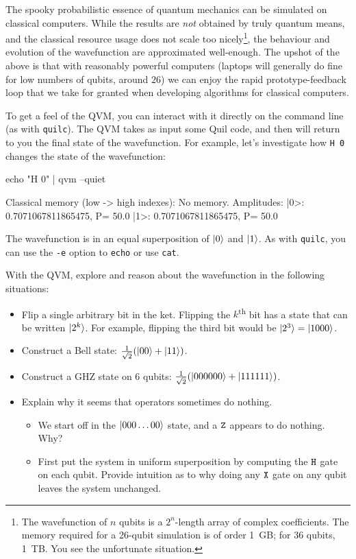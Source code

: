 The spooky probabilistic essence of quantum mechanics can be simulated on classical computers. While the results are \emph{not} obtained by truly quantum means, and the classical resource usage does not scale too nicely\footnote{The wavefunction of $n$ qubits is a $2^n$-length array of complex coefficients. The memory required for a 26-qubit simulation is of order 1~GB; for 36 qubits, 1~TB. You see the unfortunate situation.}, the behaviour and evolution of the wavefunction are approximated well-enough. The upshot of the above is that with reasonably powerful computers (laptops will generally do fine for low numbers of qubits, around $26$) we can enjoy the rapid prototype-feedback loop that we take for granted when developing algorithms for classical computers.

To get a feel of the QVM, you can interact with it directly on the command line (as with \verb|quilc|). The QVM takes as input some Quil code, and then will return to you the final state of the wavefunction. For example, let's investigate how \verb|H 0| changes the state of the wavefunction:
\begin{bash}
echo "H 0" | qvm --quiet

Classical memory (low -> high indexes):
    No memory.
Amplitudes:
    |0>: 0.7071067811865475,                                    P= 50.0%
    |1>: 0.7071067811865475,                                    P= 50.0%
\end{bash}
The wavefunction is in an equal superposition of $\ket{0}$ and $\ket{1}$. As with \verb|quilc|, you can use the \verb|-e| option to \verb|echo| or use \verb|cat|.

With the QVM, explore and reason about the wavefunction in the following situations:
\begin{itemize}
    \item Flip a single arbitrary bit in the ket. Flipping the $k$\textsuperscript{th} bit has a state that can be written $\ket{2^k}$. For example, flipping the third bit would be $\ket{2^3}=\ket{1000}$.
    \item Construct a Bell state: $\tfrac{1}{\sqrt{2}}(\ket{00}+\ket{11})$.
    \item Construct a GHZ state on 6 qubits: $\tfrac{1}{\sqrt{2}}(\ket{000000}+\ket{111111})$.
    \item Explain why it seems that operators sometimes do nothing.
    \begin{itemize}
        \item We start off in the $\ket{000\ldots00}$ state, and a $\mathtt{Z}$ appears to do nothing. Why?
        \item First put the system in uniform superposition by computing the $\mathtt{H}$ gate on each qubit. Provide intuition as to why doing any $\mathtt{X}$ gate on any qubit leaves the system unchanged.
    \end{itemize}
\end{itemize}

